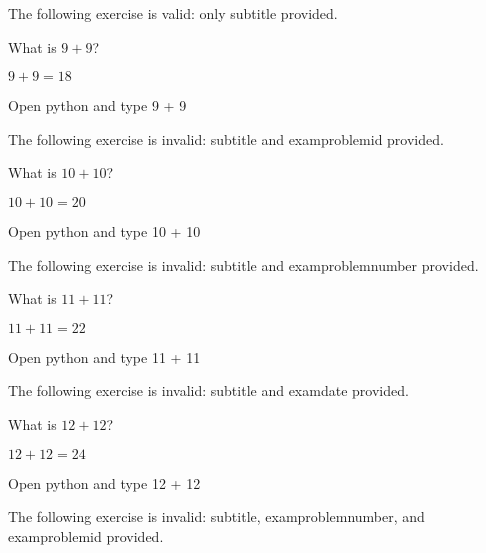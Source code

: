 \documentclass{book}
\begin{document}
The following exercise is valid: only subtitle provided.

\begin{exercise}[subtitle={Simple Addition}]
  What is \(9 + 9\)?
\end{exercise}
\begin{solution}
  \(9 + 9 = 18\)
\end{solution}
\begin{additionalinformation}
Open python and type 9 + 9
\end{additionalinformation}

The following exercise is invalid: subtitle and examproblemid provided.

\begin{exercise}[subtitle={Simple Addition}, examproblemid={2020-01-15-10}]
  What is \(10 + 10\)?
\end{exercise}
\begin{solution}
  \(10 + 10 = 20\)
\end{solution}
\begin{additionalinformation}
Open python and type 10 + 10
\end{additionalinformation}

The following exercise is invalid: subtitle and examproblemnumber provided.

\begin{exercise}[subtitle={Simple Addition}, examproblemnumber={11}]
  What is \(11 + 11\)?
\end{exercise}
\begin{solution}
  \(11 + 11 = 22\)
\end{solution}
\begin{additionalinformation}
Open python and type 11 + 11
\end{additionalinformation}

The following exercise is invalid: subtitle and examdate provided.

\begin{exercise}[subtitle={Simple Addition}, examdate={January 15, 2020}]
  What is \(12 + 12\)?
\end{exercise}
\begin{solution}
  \(12 + 12 = 24\)
\end{solution}
\begin{additionalinformation}
Open python and type 12 + 12
\end{additionalinformation}

The following exercise is invalid: subtitle, examproblemnumber, and examproblemid provided.
\end{document}
